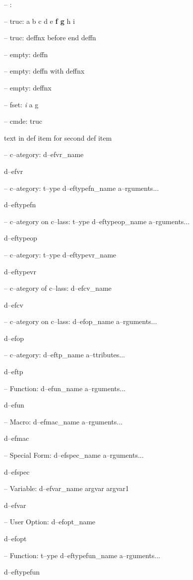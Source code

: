 \documentclass{book}
\begin{document}
\hbox{}-- : 


\hbox{}-- truc: a b c d e \textbf{f g} h i


\hbox{}-- truc: deffnx before end deffn



\hbox{}-- empty: deffn



\hbox{}-- empty: deffn with deffnx


\hbox{}-- empty: deffnx



\hbox{}-- fset: \emph{i} a g


\hbox{}-- cmde: truc 


text in def item for second def item

\hbox{}-- c--ategory: d--efvr\_name


d--efvr

\hbox{}-- c--ategory: t--ype d--eftypefn\_name a--rguments...


d--eftypefn

\hbox{}-- c--ategory on c--lass: t--ype d--eftypeop\_name a--rguments...


d--eftypeop

\hbox{}-- c--ategory: t--ype d--eftypevr\_name


d--eftypevr

\hbox{}-- c--ategory of c--lass: d--efcv\_name


d--efcv

\hbox{}-- c--ategory on c--lass: d--efop\_name a--rguments...


d--efop

\hbox{}-- c--ategory: d--eftp\_name a--ttributes...


d--eftp

\hbox{}-- Function: d--efun\_name a--rguments...


d--efun

\hbox{}-- Macro: d--efmac\_name a--rguments...


d--efmac

\hbox{}-- Special Form: d--efspec\_name a--rguments...


d--efspec

\hbox{}-- Variable: d--efvar\_name argvar argvar1


d--efvar

\hbox{}-- User Option: d--efopt\_name


d--efopt

\hbox{}-- Function: t--ype d--eftypefun\_name a--rguments...


d--eftypefun
\end{document}
